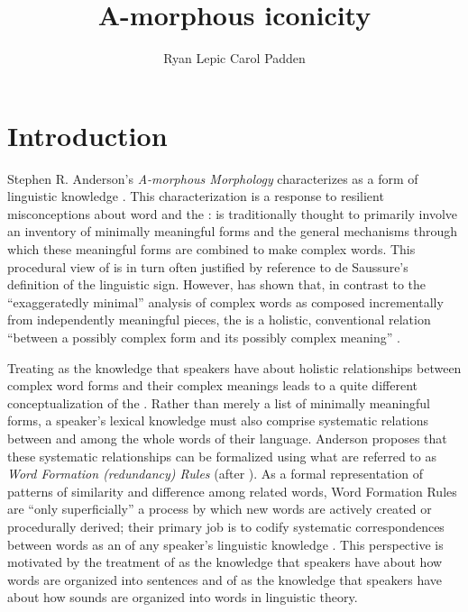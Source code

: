 \documentclass[output=paper,
modfonts
]{LSP/langsci}
\title{A-morphous iconicity}
\author{%
Ryan Lepic\affiliation{University of California, San Diego}\lastand
Carol Padden\affiliation{University of California, San Diego}
}
\begin{document}
\maketitle

\section{Introduction}

Stephen R. Anderson's \textit{A-morphous Morphology} characterizes  as a form of linguistic knowledge \citep[181]{anderson1992}. This characterization is a response to resilient misconceptions about word  and the :  is traditionally thought to primarily involve an inventory of minimally meaningful forms and the general mechanisms through which these meaningful forms are combined to make complex words. This procedural view of  is in turn often justified by reference to de Saussure's definition of the linguistic sign. However, \citet{anderson1985,anderson1992,Andersoninpress} has shown that, in contrast to the ``exaggeratedly minimal'' \citep[326]{anderson1992} analysis of complex words as composed incrementally from independently meaningful pieces, the  is a holistic, conventional relation ``between a possibly complex form and its possibly complex meaning'' \citep[193]{anderson1992}.

  Treating  as the knowledge that speakers have about holistic relationships between complex word forms and their complex meanings leads to a quite different conceptualization of the . Rather than merely a list of minimally meaningful forms, a speaker's lexical knowledge must also comprise systematic relations between and among the whole words of their language. Anderson proposes that these systematic relationships can be formalized using what are referred to as \textit{Word Formation (redundancy) Rules} (after \citealt{Jackendoff1975}). As a formal representation of patterns of similarity and difference among related words, Word Formation Rules are ``only superficially'' a process by which new words are actively created or procedurally derived; their primary job is to codify systematic correspondences between words as an  of any speaker's linguistic knowledge \citep[186]{anderson1992}. This perspective is motivated by the treatment of  as the knowledge that speakers have about how words are organized into sentences and of  as the knowledge that speakers have about how sounds are organized into words in linguistic theory.
\end{document}
